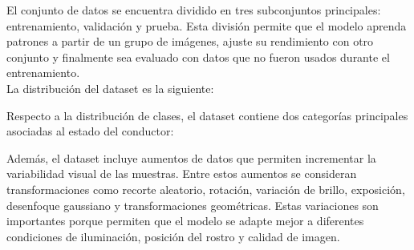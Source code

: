 \documentclass[conference]{IEEEtran}
\begin{document}
El conjunto de datos se encuentra dividido en tres subconjuntos principales: entrenamiento, validación y prueba. Esta división permite que el modelo aprenda patrones a partir de un grupo de imágenes, ajuste su rendimiento con otro conjunto y finalmente sea evaluado con datos que no fueron usados durante el entrenamiento.\\

La distribución del dataset es la siguiente:

\begin{table}[H]
\centering
\caption{Distribución del dataset por subconjunto}
\label{tab:distribucion_dataset}
\end{table}

Respecto a la distribución de clases, el dataset contiene dos categorías principales asociadas al estado del conductor:

\begin{table}[H]
\centering
\caption{Distribución de clases del dataset}
\label{tab:clases_dataset}
\end{table}

Además, el dataset incluye aumentos de datos que permiten incrementar la variabilidad visual de las muestras. Entre estos aumentos se consideran transformaciones como recorte aleatorio, rotación, variación de brillo, exposición, desenfoque gaussiano y transformaciones geométricas. Estas variaciones son importantes porque permiten que el modelo se adapte mejor a diferentes condiciones de iluminación, posición del rostro y calidad de imagen.
\end{document}
